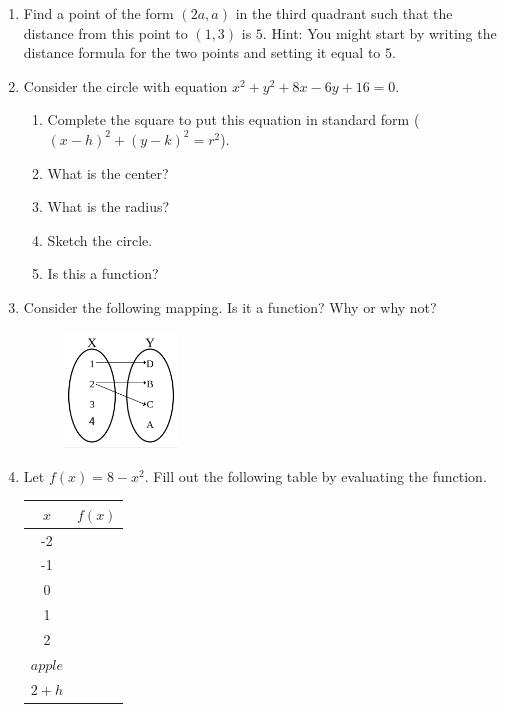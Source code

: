 \documentclass[12pt]{amsart}
\begin{document}
\begin{enumerate}
 \item Find a point of the form $(2a,a)$ in the third quadrant such that the distance from this point to $(1,3)$ is $5$.  Hint:  You might start by writing the distance formula for the two points and setting it equal to $5$.

\item Consider the circle with equation $x^2+y^2+8x-6y+16=0$.
\begin{enumerate}
\item Complete the square to put this equation in standard form ($(x-h)^2+(y-k)^2=r^2$).
\item What is the center?
\item What is the radius?
\item Sketch the circle.
\item Is this a function?
\end{enumerate}



\item Consider the following mapping.  Is it a function?  Why or why not?
\begin{figure}[!h]
\includegraphics[width=3cm]{notfunction.png}
\end{figure}
      



\item Let $f(x)=8-x^2$.  Fill out the following table by evaluating the function.
\begin{center}
 \begin{tabular}{||c c||} 
 \hline
 $x$ & $f(x)$ \\ [0.5ex] 
 \hline\hline
 -2 &   \\ 
 \hline
 -1 &   \\
 \hline
 0 &  \\
 \hline
 1 &   \\
 \hline
 2 &  \\
 \hline
  $apple$ &  \\ 
 \hline
  $2+h$ & \\
   \hline
\end{tabular}
\end{center}      


\end{enumerate}
\end{document}
